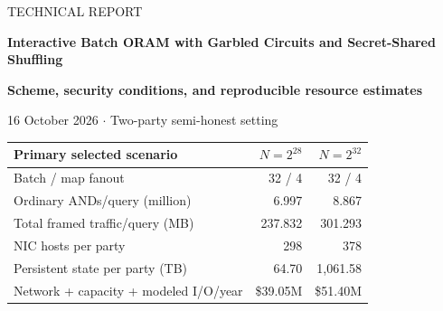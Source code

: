 \documentclass[11pt]{article}
\newcommand{\PrimaryAnnualSmall}{\$39.05M}
\newcommand{\PrimaryAnnualLarge}{\$51.40M}
\begin{document}
{\color{teal}\large TECHNICAL REPORT\par}
{\color{navy}\LARGE\bfseries Interactive Batch ORAM with Garbled Circuits and Secret-Shared Shuffling\par}
\vspace{4pt}
\textbf{Scheme, security conditions, and reproducible resource estimates}\par
16 October 2026 \quad $\cdot$ \quad Two-party semi-honest setting
\vspace{8pt}

\begin{abstract}
We study a private key--value service combining two-choice cuckoo hashing,
recursive Circuit-OPRAM-style batching, streamed garbled circuits, and an
interactive secret-shared shuffle. Both the database and each 256-bit query
key are private; neither server is assumed to know the query. An AES-CMAC
PRF computes both cuckoo indices inside the secure computation. Our main
optimization matches requests to pool records, attaches secret request tags,
shuffles the tagged records with a permutation unknown to either party, and
opens only the shuffled tags. Payload extraction and removal then become
local operations on shares. A fixed number of uniquely tagged dummies hides
pool misses and duplicate requests.

We derive a complete accounting ledger for the selected compilation template,
including garbled tables, both directions of OT traffic, shuffle preprocessing,
conversion between representations, recursive-map updates, persistent state,
and modeled storage I/O. The primary estimate uses ordinary Boolean records
outside the shuffle; it does not require an unverified two-label conditional
swap. Packed-value storage is reported as a conditional sensitivity.
At 10,000 lookups/s, the selected batch has 32 requests for both studied sizes.
The resulting historical-price network, state-capacity, and modeled-I/O budgets
are \PrimaryAnnualSmall{} and \PrimaryAnnualLarge{} per year. These are
capacity scenarios, not measured deployment costs or throughput guarantees:
the inherited parallel eviction and grouping routines remain circuit
composition allowances, and CPU, state service time, initialization, and
overflow probabilities require validation.
\end{abstract}

\begin{center}\small
\begin{tabular}{lrr}\toprule
Primary selected scenario & $N=2^{28}$ & $N=2^{32}$\\\midrule
Batch / map fanout & 32 / 4 & 32 / 4\\
Ordinary ANDs/query (million) & 6.997 & 8.867\\
Total framed traffic/query (MB) & 237.832 & 301.293\\
NIC hosts per party & 298 & 378\\
Persistent state per party (TB) & 64.70 & 1,061.58\\
Network + capacity + modeled I/O/year & \$39.05M & \$51.40M\\
\bottomrule\end{tabular}
\end{center}
\end{document}
